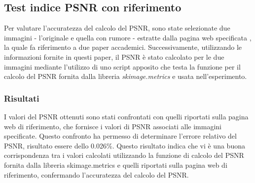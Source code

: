 \subsection{Test indice PSNR con riferimento}
Per valutare l'accuratezza del calcolo del PSNR, sono state selezionate due immagini - l'originale e quella con rumore - estratte dalla pagina web specificata \cite{PSNR-HVS}, la quale fa riferimento a due paper accademici. Successivamente, utilizzando le informazioni fornite in questi paper, il PSNR è stato calcolato per le due immagini mediante l'utilizzo di uno script apposito che testa la funzione per il calcolo del PSNR fornita dalla libreria \textit{skimage.metrics} e usata nell'esperimento.

\subsubsection{Risultati}
I valori del PSNR ottenuti sono stati confrontati con quelli riportati sulla pagina web di riferimento, che fornisce i valori di PSNR associati alle immagini specificate. Questo confronto ha permesso di determinare l'errore relativo del PSNR, risultato essere dello 0.026\%. Questo risultato indica che vi è una buona corrispondenza tra i valori calcolati utilizzando la funzione di calcolo del PSNR fornita dalla libreria skimage.metrics e quelli riportati sulla pagina web di riferimento, confermando l'accuratezza del calcolo del PSNR.